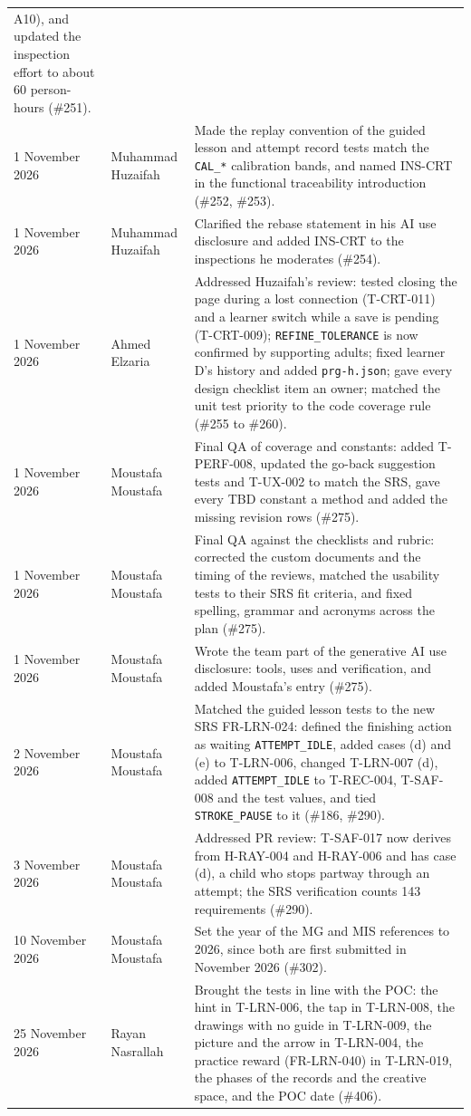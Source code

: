\documentclass[12pt, titlepage]{article}
\begin{document}
{\begin{longtable}{@{}p{3cm}>{\raggedright\arraybackslash}p{3.3cm}
>{\raggedright\arraybackslash}p{\dimexpr\textwidth-6.3cm-4\tabcolsep\relax}@{}}
A10), and updated the inspection effort to about 60 person-hours (\#251).\\
1 November 2026 & Muhammad Huzaifah & Made the replay convention of the
guided lesson and attempt record tests match the \texttt{CAL\_*} calibration
bands, and named INS-CRT in the functional traceability introduction
(\#252, \#253).\\
1 November 2026 & Muhammad Huzaifah & Clarified the rebase statement in his
AI use disclosure and added INS-CRT to the inspections he moderates
(\#254).\\
1 November 2026 & Ahmed Elzaria & Addressed Huzaifah's review: tested
closing the page during a lost connection (T-CRT-011) and a learner switch
while a save is pending (T-CRT-009); \texttt{REFINE\_TOLERANCE} is now
confirmed by supporting adults; fixed learner D's history and added
\texttt{prg-h.json}; gave every design checklist item an owner; matched
the unit test priority to the code coverage rule (\#255 to \#260).\\
1 November 2026 & Moustafa Moustafa & Final QA of coverage and constants: added
T-PERF-008, updated the go-back suggestion tests and T-UX-002 to match the SRS,
gave every TBD constant a method and added the missing revision rows (\#275).\\
1 November 2026 & Moustafa Moustafa & Final QA against the checklists and rubric:
corrected the custom documents and the timing of the reviews, matched the
usability tests to their SRS fit criteria, and fixed spelling, grammar and
acronyms across the plan (\#275).\\
1 November 2026 & Moustafa Moustafa & Wrote the team part of the generative AI
use disclosure: tools, uses and verification, and added Moustafa's entry (\#275).\\
2 November 2026 & Moustafa Moustafa & Matched the guided lesson tests to the new
SRS FR-LRN-024: defined the finishing action as waiting \texttt{ATTEMPT\_IDLE},
added cases (d) and (e) to T-LRN-006, changed T-LRN-007 (d), added
\texttt{ATTEMPT\_IDLE} to T-REC-004, T-SAF-008 and the test values, and tied
\texttt{STROKE\_PAUSE} to it (\#186, \#290).\\
3 November 2026 & Moustafa Moustafa & Addressed PR review: T-SAF-017 now derives
from H-RAY-004 and H-RAY-006 and has case (d), a child who stops partway
through an attempt; the SRS verification counts 143 requirements (\#290).\\
10 November 2026 & Moustafa Moustafa & Set the year of the MG and MIS
references to 2026, since both are first submitted in November 2026
(\#302).\\
25 November 2026 & Rayan Nasrallah & Brought the tests in line with the POC:
the hint in T-LRN-006, the tap in T-LRN-008, the drawings with no guide in
T-LRN-009, the picture and the arrow in T-LRN-004, the practice reward
(FR-LRN-040) in T-LRN-019, the phases of the records and the creative space,
and the POC date (\#406).\\
\end{longtable}
}
\addtocounter{table}{-1}
\end{document}
